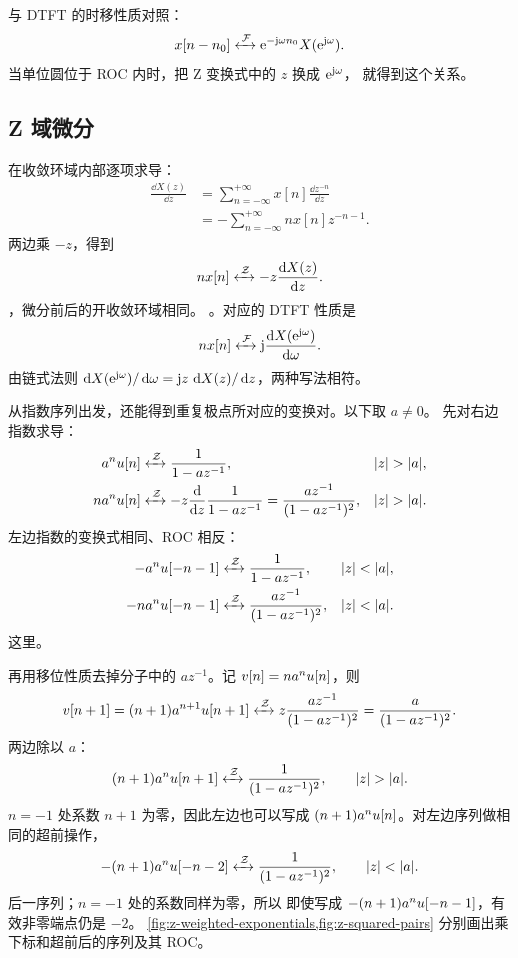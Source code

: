 与 DTFT 的时移性质对照：
\[
  x[n-n_0]\mathrel{\xleftrightarrow{\,\mathcal{F}\,}}
  \mathrm{e}^{-\mathrm{j}\omega n_0}X(\mathrm{e}^{\mathrm{j}\omega}).
\]
当单位圆位于 ROC 内时，把 Z 变换式中的 $z$ 换成 $\mathrm{e}^{\mathrm{j}\omega}$，
就得到这个关系。

\subsection{Z 域微分}

在收敛环域内部逐项求导：
\begin{align*}
  \frac{\dd X(z)}{\dd z}
  &=\sum_{n=-\infty}^{+\infty}x[n]\frac{\dd z^{-n}}{\dd z}\\
  &=-\sum_{n=-\infty}^{+\infty}nx[n]z^{-n-1}.
\end{align*}
两边乘 $-z$，得到
\begin{equation}
  nx[n]\mathrel{\xleftrightarrow{\,\mathcal{Z}\,}}-z\frac{\mathop{}\!\mathrm{d} X(z)}{\mathop{}\!\mathrm{d} z}.
  \label{eq:z-differentiation}
\end{equation}
，微分前后的开收敛环域相同。
。对应的 DTFT 性质是
\[
  nx[n]\mathrel{\xleftrightarrow{\,\mathcal{F}\,}}
  \mathrm{j}\frac{\mathop{}\!\mathrm{d} X(\mathrm{e}^{\mathrm{j}\omega})}{\mathop{}\!\mathrm{d}\omega}.
\]
由链式法则 $\mathop{}\!\mathrm{d} X(\mathrm{e}^{\mathrm{j}\omega})/\mathop{}\!\mathrm{d}\omega
=\mathrm{j} z\,\mathop{}\!\mathrm{d} X(z)/\mathop{}\!\mathrm{d} z$，两种写法相符。

从指数序列出发，还能得到重复极点所对应的变换对。以下取 $a\neq0$。
先对右边指数求导：
\begin{align}
  a^n\stepfun[n]&\zpair\frac{1}{1-az^{-1}},
    &&|z|>|a|,\notag\\
  na^n\stepfun[n]
    &\zpair-z\frac{\dd}{\dd z}\frac{1}{1-az^{-1}}
      =\frac{az^{-1}}{(1-az^{-1})^2},
    &&|z|>|a|.
  \label{eq:z-weighted-right-exponential}
\end{align}
左边指数的变换式相同、ROC 相反：
\begin{align}
  -a^n\stepfun[-n-1]&\zpair\frac{1}{1-az^{-1}},
    &&|z|<|a|,\notag\\
  -na^n\stepfun[-n-1]
    &\zpair\frac{az^{-1}}{(1-az^{-1})^2},
    &&|z|<|a|.
  \label{eq:z-weighted-left-exponential}
\end{align}
这里。

再用移位性质去掉分子中的 $az^{-1}$。记
$v[n]=na^nu[n]$，则
\[
  v[n+1]=(n+1)a^{n+1}u[n+1]
  \mathrel{\xleftrightarrow{\,\mathcal{Z}\,}} z\frac{az^{-1}}{(1-az^{-1})^2}
  =\frac{a}{(1-az^{-1})^2}.
\]
两边除以 $a$：
\begin{equation}
  (n+1)a^n\stepfun[n+1]
  \zpair\frac{1}{(1-az^{-1})^2},
  \qquad |z|>|a|.
  \label{eq:z-squared-right-pair}
\end{equation}
$n=-1$ 处系数 $n+1$ 为零，因此左边也可以写成
$(n+1)a^nu[n]$。对左边序列做相同的超前操作，
\begin{equation}
  -(n+1)a^n\stepfun[-n-2]
  \zpair\frac{1}{(1-az^{-1})^2},
  \qquad |z|<|a|.
  \label{eq:z-squared-left-pair}
\end{equation}
后一序列；$n=-1$ 处的系数同样为零，所以
即使写成 $-(n+1)a^nu[-n-1]$，有效非零端点仍是 $-2$。
\cref{fig:z-weighted-exponentials,fig:z-squared-pairs}
分别画出乘下标和超前后的序列及其 ROC。

